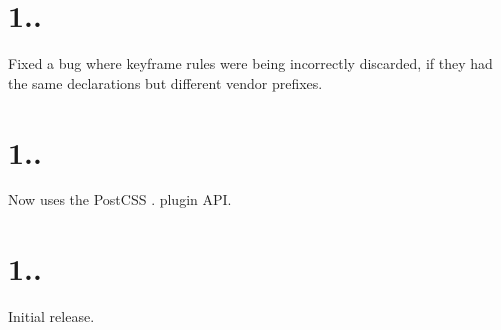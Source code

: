 \section*{1..}


\begin{DoxyItemize}
\item Fixed a bug where keyframe rules were being incorrectly discarded, if they had the same declarations but different vendor prefixes.
\end{DoxyItemize}

\section*{1..}


\begin{DoxyItemize}
\item Now uses the Post\+C\+SS {.} plugin A\+PI.
\end{DoxyItemize}

\section*{1..}


\begin{DoxyItemize}
\item Initial release. 
\end{DoxyItemize}